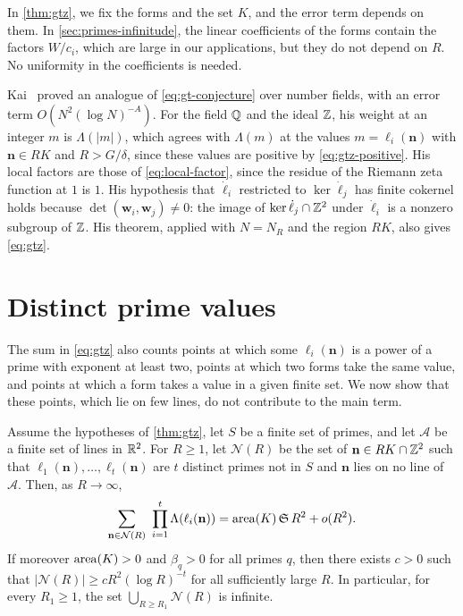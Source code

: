 \begin{remark}\label{rem:gtz-fixed}
In \cref{thm:gtz}, we fix the forms and the set $K$, and the error term depends on them. In \cref{sec:primes-infinitude}, the linear coefficients of the forms contain the factors $W/c_i$, which are large in our applications, but they do not depend on $R$. No uniformity in the coefficients is needed.

Kai~\cite[Theorem~12.1]{Kai} proved an analogue of \eqref{eq:gt-conjecture} over number fields, with an error term $O(N^2(\log N)^{-A})$. For the field $\mathbb Q$ and the ideal $\mathbb Z$, his weight at an integer $m$ is $\Lambda(|m|)$, which agrees with $\Lambda(m)$ at the values $m=\ell_i(\mathbf n)$ with $\mathbf n\in RK$ and $R>G/\delta$, since these values are positive by \eqref{eq:gtz-positive}. His local factors are those of \eqref{eq:local-factor}, since the residue of the Riemann zeta function at $1$ is $1$. His hypothesis that $\dot\ell_i$ restricted to $\ker\dot\ell_j$ has finite cokernel holds because $\det(\mathbf w_i,\mathbf w_j)\ne0$: the image of $\ker\dot\ell_j\cap\mathbb Z^2$ under $\dot\ell_i$ is a nonzero subgroup of $\mathbb Z$. His theorem, applied with $N=N_R$ and the region $RK$, also gives \eqref{eq:gtz}.
\end{remark}

\section{Distinct prime values}\label{sec:primes-exclusions}

The sum in \eqref{eq:gtz} also counts points at which some $\ell_i(\mathbf n)$ is a power of a prime with exponent at least two, points at which two forms take the same value, and points at which a form takes a value in a given finite set. We now show that these points, which lie on few lines, do not contribute to the main term.

\begin{lemma}\label{lem:prime-exclusions}
Assume the hypotheses of \cref{thm:gtz}, let $S$ be a finite set of primes, and let $\mathcal A$ be a finite set of lines in $\mathbb R^2$. For $R\ge1$, let $\mathcal N(R)$ be the set of $\mathbf n\in RK\cap\mathbb Z^2$ such that $\ell_1(\mathbf n),\dots,\ell_t(\mathbf n)$ are $t$ distinct primes not in $S$ and $\mathbf n$ lies on no line of $\mathcal A$. Then, as $R\to\infty$,
\begin{equation}\label{eq:prime-exclusions}
\sum_{\mathbf n\in\mathcal N(R)}\ \prod_{i=1}^t\Lambda(\ell_i(\mathbf n))=\operatorname{area}(K)\,\mathfrak S\,R^2+o(R^2).
\end{equation}
If moreover $\operatorname{area}(K)>0$ and $\beta_q>0$ for all primes $q$, then there exists $c>0$ such that $|\mathcal N(R)|\ge cR^2(\log R)^{-t}$ for all sufficiently large $R$. In particular, for every $R_1\ge1$, the set $\bigcup_{R\ge R_1}\mathcal N(R)$ is infinite.
\end{lemma}

